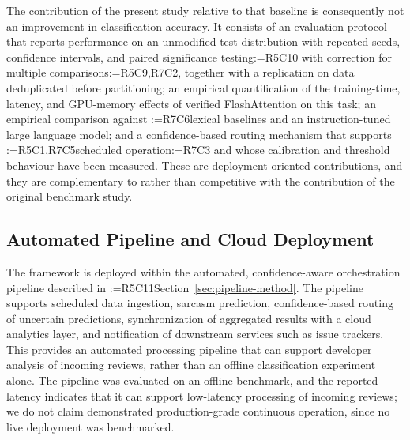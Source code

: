 \documentclass[a4paper,fleqn]{cas-sc}
\makeatletter
\newif\iftracked
\newcommand{\rv@setcolour}[1]{%
  \IfStrEq{#1}{R7C7}{\color{rvEdit}}{%
    \IfSubStr{#1}{R5}{\IfSubStr{#1}{R7}{\color{rvBoth}}{\color{rvFive}}}{\color{rvSeven}}}}
\newcommand{\rv@tag}[1]{\textsuperscript{\sffamily\bfseries\scriptsize[\StrSubstitute{#1}{,}{, }]}\,}
\newcommand{\rv@recordone}[1]{%
  \edef\rv@i{#1}%
  \ifcsdef{rv@n@\rv@i}{}{\csgdef{rv@n@\rv@i}{0}}%
  \csxdef{rv@n@\rv@i}{\the\numexpr\csuse{rv@n@\rv@i}+1\relax}%
  \begingroup\edef\@currentlabel{\rv@i}\label{rv:\rv@i:\csuse{rv@n@\rv@i}}\endgroup}
\newcommand{\rv@record}[1]{\@for\rv@id:=#1\do{\expandafter\rv@recordone\expandafter{\rv@id}}}
\DeclareRobustCommand{\rc}[2]{\rv@record{#1}\iftracked{\rv@setcolour{#1}\rv@tag{#1}#2}\else#2\fi}
\DeclareRobustCommand{\rcrep}[3]{\rv@record{#1}\iftracked{\rv@setcolour{#1}\rv@tag{#1}\rv@strike{#2} #3}\else#3\fi}
\makeatother
\begin{document}
The contribution of the present study relative to that baseline is consequently not an improvement in classification accuracy. It consists of an evaluation protocol that reports performance on an unmodified test distribution with repeated seeds, confidence intervals, and paired significance testing\rc{R5C10}{ with correction for multiple comparisons}\rc{R5C9,R7C2}{, together with a replication on data deduplicated before partitioning}; an empirical quantification of the training-time, latency, and GPU-memory effects of verified FlashAttention on this task; an empirical comparison against \rc{R7C6}{lexical baselines and} an instruction-tuned large language model; and a confidence-based routing mechanism that supports \rcrep{R5C1,R7C5}{continuous operation}{scheduled operation\rc{R7C3}{ and whose calibration and threshold behaviour have been measured}}. These are deployment-oriented contributions, and they are complementary to rather than competitive with the contribution of the original benchmark study.

\subsection{Automated Pipeline and Cloud Deployment}
\label{sec:pipeline-results}
The framework is deployed within the automated, confidence-aware orchestration pipeline described in \rcrep{R5C11}{Section 3.7}{Section~\ref{sec:pipeline-method}}. The pipeline supports scheduled data ingestion, sarcasm prediction, confidence-based routing of uncertain predictions, synchronization of aggregated results with a cloud analytics layer, and notification of downstream services such as issue trackers. This provides an automated processing pipeline that can support developer analysis of incoming reviews, rather than an offline classification experiment alone. The pipeline was evaluated on an offline benchmark, and the reported latency indicates that it can support low-latency processing of incoming reviews; we do not claim demonstrated production-grade continuous operation, since no live deployment was benchmarked.
\end{document}
